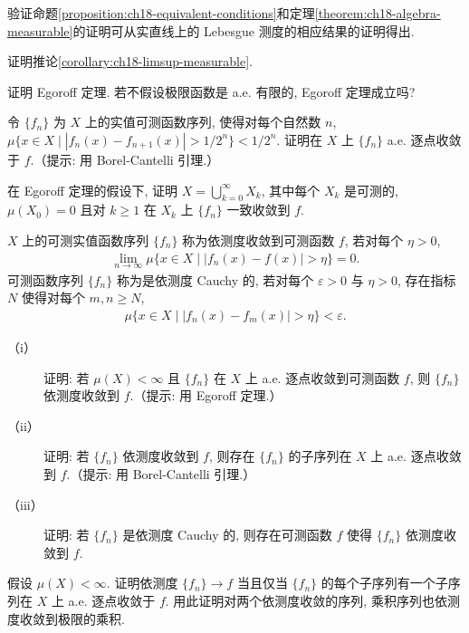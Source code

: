 \documentclass[../../main.tex]{subfiles}
\begin{document}
\begin{exercise}\label{exercise:ch18-10}
验证命题\cref{proposition:ch18-equivalent-conditions}和定理\cref{theorem:ch18-algebra-measurable}的证明可从实直线上的 Lebesgue 测度的相应结果的证明得出.
\end{exercise}

\begin{exercise}\label{exercise:ch18-11}
证明推论\cref{corollary:ch18-limsup-measurable}.
\end{exercise}

\begin{exercise}\label{exercise:ch18-12}
证明 Egoroff 定理. 若不假设极限函数是 a.e. 有限的, Egoroff 定理成立吗?
\end{exercise}

\begin{exercise}\label{exercise:ch18-13}
令 $\{f_{n}\}$ 为 $X$ 上的实值可测函数序列, 使得对每个自然数 $n$, $\mu\{x\in X\mid|f_{n}(x)-f_{n+1}(x)|>1/2^{n}\}<1/2^{n}$. 证明在 $X$ 上 $\{f_{n}\}$ a.e. 逐点收敛于 $f$.（提示: 用 Borel-Cantelli 引理.）
\end{exercise}

\begin{exercise}\label{exercise:ch18-14}
在 Egoroff 定理的假设下, 证明 $X=\bigcup_{k=0}^{\infty}X_{k}$, 其中每个 $X_{k}$ 是可测的, $\mu(X_{0})=0$ 且对 $k\geqslant 1$ 在 $X_{k}$ 上 $\{f_{n}\}$ 一致收敛到 $f$.
\end{exercise}

\begin{exercise}\label{exercise:ch18-15}
$X$ 上的可测实值函数序列 $\{f_{n}\}$ 称为依测度收敛到可测函数 $f$, 若对每个 $\eta>0$,
\begin{align*}
\lim_{n\to\infty}\mu\{x\in X\mid|f_{n}(x)-f(x)|>\eta\}=0.
\end{align*}
可测函数序列 $\{f_{n}\}$ 称为是依测度 Cauchy 的, 若对每个 $\varepsilon>0$ 与 $\eta>0$, 存在指标 $N$ 使得对每个 $m,n\geqslant N$,
\begin{align*}
\mu\{x\in X\mid|f_{n}(x)-f_{m}(x)|>\eta\}<\varepsilon.
\end{align*}
\begin{description}
\item[（i）] 证明: 若 $\mu(X)<\infty$ 且 $\{f_{n}\}$ 在 $X$ 上 a.e. 逐点收敛到可测函数 $f$, 则 $\{f_{n}\}$ 依测度收敛到 $f$.（提示: 用 Egoroff 定理.）
\item[（ii）] 证明: 若 $\{f_{n}\}$ 依测度收敛到 $f$, 则存在 $\{f_{n}\}$ 的子序列在 $X$ 上 a.e. 逐点收敛到 $f$.（提示: 用 Borel-Cantelli 引理.）
\item[（iii）] 证明: 若 $\{f_{n}\}$ 是依测度 Cauchy 的, 则存在可测函数 $f$ 使得 $\{f_{n}\}$ 依测度收敛到 $f$.
\end{description}
\end{exercise}

\begin{exercise}\label{exercise:ch18-16}
假设 $\mu(X)<\infty$. 证明依测度 $\{f_{n}\}\to f$ 当且仅当 $\{f_{n}\}$ 的每个子序列有一个子序列在 $X$ 上 a.e. 逐点收敛于 $f$. 用此证明对两个依测度收敛的序列, 乘积序列也依测度收敛到极限的乘积.
\end{exercise}
\end{document}
